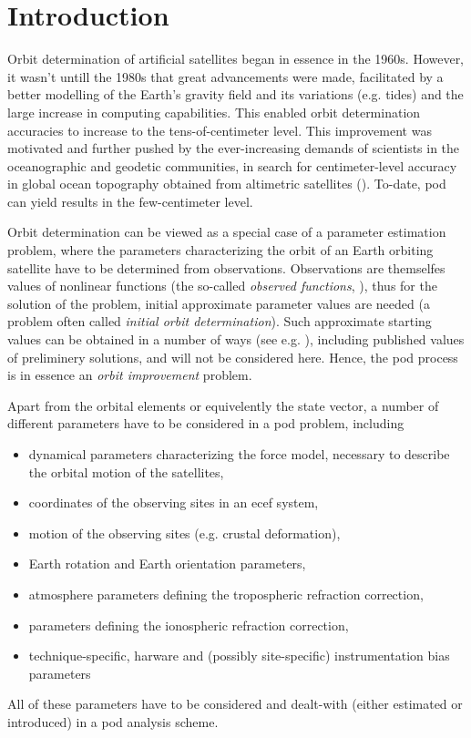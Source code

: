 \section{Introduction}\label{sec:pod-introduction}

Orbit determination of artificial satellites began in essence in the 1960s. However, 
it wasn't untill the 1980s that great advancements were made, facilitated by 
a better modelling of the Earth's gravity field and its variations (e.g. tides) and 
the large increase in computing capabilities. This enabled orbit determination 
accuracies to increase to the tens-of-centimeter level. This improvement was 
motivated and further pushed by the ever-increasing demands of scientists in the 
oceanographic and geodetic communities, in search for centimeter-level accuracy 
in global ocean topography obtained from altimetric satellites (\cite{Tapley2004}).
To-date, \gls{pod} can yield results in the  few-centimeter level.

Orbit determination can be viewed as a special case of a parameter estimation problem, 
where the parameters characterizing the orbit of an Earth orbiting satellite have to be 
determined from observations. Observations are themselfes values of nonlinear functions 
(the so-called \emph{observed functions}, \cite{BeutlerVII}), thus for the solution 
of the problem, initial approximate parameter values are needed (a problem often 
called \emph{initial orbit determination}). Such approximate starting values can be 
obtained in a number of ways (see e.g. \cite{Vallado2001}), including published 
values of preliminery solutions, and will not be considered here. Hence, the \gls{pod} 
process is in essence an \emph{orbit improvement} problem.

Apart from the orbital elements or equivelently the state vector, a number of 
different parameters have to be considered in a \gls{pod} problem, including
\begin{itemize}
    \item dynamical parameters characterizing the force model, necessary to describe 
        the orbital motion of the satellites,
    \item coordinates of the observing sites in an \gls{ecef} system,
    \item motion of the observing sites (e.g. crustal deformation),
    \item Earth rotation and Earth orientation parameters,
    \item atmosphere parameters deﬁning the tropospheric refraction correction,
    \item parameters deﬁning the ionospheric refraction correction,
    \item technique-speciﬁc, harware and (possibly site-specific) instrumentation 
        bias parameters
\end{itemize}
All of these parameters have to be considered and dealt-with (either estimated or 
introduced) in a \gls{pod} analysis scheme. 

